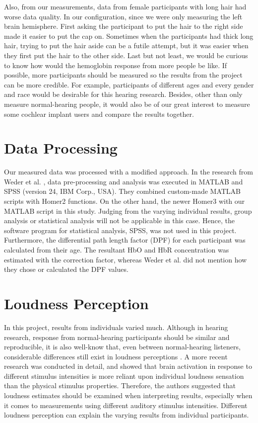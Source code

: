Also, from our measurements, data from female participants with long hair had worse data quality. In our configuration, since we were only measuring the left brain hemisphere. First asking the participant to put the hair to the right side made it easier to put the cap on. Sometimes when the participants had thick long hair, trying to put the hair aside can be a futile attempt, but it was easier when they first put the hair to the other side. Last but not least, we would be curious to know how would the hemoglobin response from more people be like. If possible, more participants should be measured so the results from the project can be more credible. For example, participants of different ages and every gender and race would be desirable for this hearing research. Besides, other than only measure normal-hearing people, it would also be of our great interest to measure some cochlear implant users and compare the results together.

\section {Data Processing}
Our measured data was processed with a modified approach. In the research from Weder et al. \citeyearpar{Weder2018}, data pre-processing and analysis was executed in MATLAB and SPSS (version 24, IBM Corp., USA). They combined custom-made MATLAB scripts with Homer2 \citep{Huppert:09} functions. On the other hand, the newer Homer3 \citep{Huppert:09} with our MATLAB script in this study. Judging from the varying individual results, group analysis or statistical analysis will not be applicable in this case. Hence, the software program for statistical analysis, SPSS, was not used in this project. Furthermore, the differential path length factor (DPF) for each participant was calculated from their age. The resultant HbO and HbR concentration was estimated with the correction factor, whereas Weder et al. \citeyearpar{Weder2018} did not mention how they chose or calculated the DPF values.

\section{Loudness Perception}
In this project, results from individuals varied much. Although in hearing research, response from normal-hearing participants should be similar and reproducible, it is also well-know that, even between normal-hearing listeners,
considerable differences still exist in loudness perceptions \citep{Brand2001}. A more recent research \citep{Weder2020} was conducted in detail, and showed that brain activation in response to different stimulus intensities is more reliant upon individual loudness sensation than the physical stimulus properties. Therefore, the authors suggested that loudness
estimates should be examined when interpreting results, especially when it comes to measurements using different auditory stimulus intensities. Different loudness perception can explain the varying results from individual participants.

